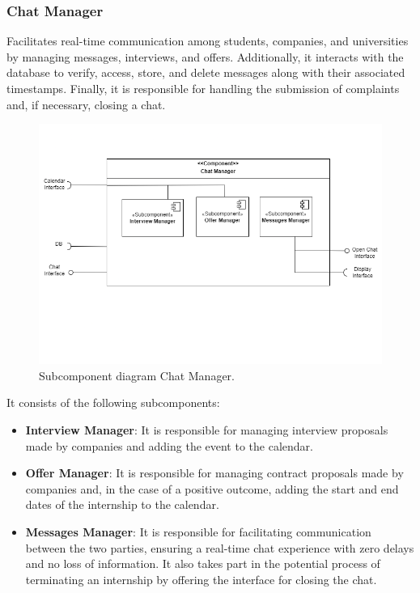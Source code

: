 \subsubsection{Chat Manager} Facilitates real-time communication among students, companies, and universities by managing messages, interviews, and offers. Additionally, it interacts with the database to verify, access, store, and delete messages along with their associated timestamps. Finally, it is responsible for handling the submission of complaints and, if necessary, closing a chat.
\begin{figure}[htbp]
    \centering
    \includegraphics[width=\linewidth]{DD/Images/Comp&Sub/ChatManager.png}
    \caption{Subcomponent diagram Chat Manager.}
    \label{fig:chat_manager}
    \end{figure}
    
It consists of the following subcomponents:
\begin{itemize}
    \item  \textbf{Interview Manager}: It is responsible for managing interview proposals made by companies and adding the event to the calendar.
    \item  \textbf{Offer Manager}: It is responsible for managing contract proposals made by companies and, in the case of a positive outcome, adding the start and end dates of the internship to the calendar.
    \item  \textbf{Messages Manager}: It is responsible for facilitating communication between the two parties, ensuring a real-time chat experience with zero delays and no loss of information.
    It also takes part in the potential process of terminating an internship by offering the interface for closing the chat.
    \end{itemize}

